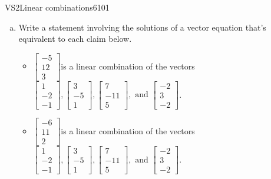 \begin{exercise}{VS2}{Linear combinations}{6101} 
\begin{exerciseStatement} 

\begin{enumerate}[(a)]
\item  

 Write a statement involving the solutions of a vector equation that's equivalent to each claim below. 

 

\begin{itemize}
\item  

 \(\left[\begin{array}{c}
-5 \\
12 \\
3
\end{array}\right]\)is a linear combination of the vectors \(\left[\begin{array}{c}
1 \\
-2 \\
-1
\end{array}\right] , \left[\begin{array}{c}
3 \\
-5 \\
1
\end{array}\right] , \left[\begin{array}{c}
7 \\
-11 \\
5
\end{array}\right] , \text{ and } \left[\begin{array}{c}
-2 \\
3 \\
-2
\end{array}\right]\). 

 
\item  

 \(\left[\begin{array}{c}
-6 \\
11 \\
2
\end{array}\right]\)is a linear combination of the vectors \(\left[\begin{array}{c}
1 \\
-2 \\
-1
\end{array}\right] , \left[\begin{array}{c}
3 \\
-5 \\
1
\end{array}\right] , \left[\begin{array}{c}
7 \\
-11 \\
5
\end{array}\right] , \text{ and } \left[\begin{array}{c}
-2 \\
3 \\
-2
\end{array}\right]\). 


\end{itemize}
\end{enumerate}
\end{exerciseStatement}
\end{exercise}
